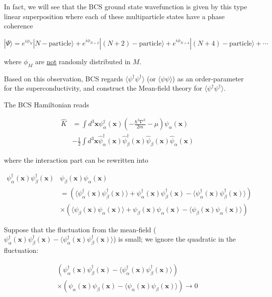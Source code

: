 ﻿\documentclass[twoside]{book}
\numberwithin{equation}{section}
\begin{document}
In fact, we will see that the BCS ground state wavefunction is given by this type linear superposition where each of these multiparticle states have a phase coherence

\[|\Psi\rangle = e^{i\phi_N}|N-\text{particle}\rangle + e^{i\phi_{N+2}}|(N+2)-\text{particle}\rangle + e^{i\phi_{N+4}}|(N+4)-\text{particle}\rangle + \cdots  \]

where $\phi_M$ are \uline{not} randomly distributed in $M$. 

Based on this observation, BCS regards $\langle\psi^{\dagger}\psi^{\dagger}\rangle$ (or $\langle \psi\psi\rangle$) as an order-parameter for the superconductivity, and construct the Mean-field theory for $\langle \psi^{\dagger}\psi^{\dagger}\rangle$. 

The BCS Hamiltonian reads 

\[\begin{split}\hat{K}& = \int d^3 \bm{x}\psi^{\dagger}_{\alpha}(\bm{x})\left(-\frac{\hbar^2\nabla^2}{2m} - \mu\right)\psi_{\alpha}(\bm{x})\\
&-\frac{1}{2} \int d^3\bm{x} \hat{\psi}_{\alpha}^{\dagger}(\bm{x}) \hat{\psi}_{\beta}^{\dagger}(\bm{x}) \hat{\psi}_{\beta}(\bm{x})\hat{\psi}_{\alpha}(\bm{x}) \end{split}\]

where the interaction part can be rewritten into 

\[\begin{split}\psi_{\alpha}^{\dagger}(\bm{x})\psi_{\beta}^{\dagger}(\bm{x})&\psi_{\beta}(\bm{x})\psi_{\alpha}(\bm{x})\\
 &=  \left(\langle\psi^{\dagger}_{\alpha}(\bm{x})\psi^{\dagger}_{\beta}(\bm{x})\rangle + \psi^{\dagger}_{\alpha}(\bm{x})\psi^{\dagger}_{\beta}(\bm{x}) - \langle\psi^{\dagger}_{\alpha}(\bm{x})\psi^{\dagger}_{\beta}(\bm{x})\rangle\right)\\
&\times \left(\langle\psi_{\beta}(\bm{x})\psi_{\alpha}(\bm{x})\rangle + \psi_{\beta}(\bm{x})\psi_{\alpha}(\bm{x}) - \langle\psi_{\beta}(\bm{x})\psi_{\alpha}(\bm{x})\rangle\right)
\end{split}\]

Suppose that the fluctuation from the mean-field ($\psi^{\dagger}_{\alpha}(\bm{x})\psi^{\dagger}_{\beta}(\bm{x}) - \langle\psi^{\dagger}_{\alpha}(\bm{x})\psi^{\dagger}_{\beta}(\bm{x})\rangle$) is small; we ignore the quadratic in the fluctuation: 

\[\begin{split}
\left(\psi^{\dagger}_{\alpha}(\bm{x})\psi^{\dagger}_{\beta}(\bm{x}) - \langle\psi^{\dagger}_{\alpha}(\bm{x})\psi^{\dagger}_{\beta}(\bm{x})\rangle\right)\\
\times \left(\psi_{\alpha}(\bm{x})\psi_{\beta}(\bm{x}) - \langle\psi_{\alpha}(\bm{x})\psi_{\beta}(\bm{x})\rangle\right) \rightarrow 0\end{split}\]
\end{document}
